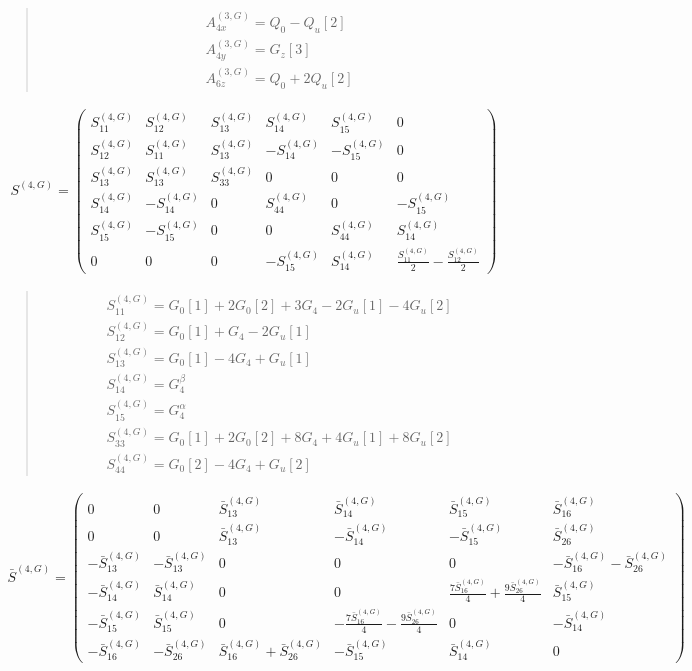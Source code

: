 \documentclass[fleqn,10pt]{jsarticle}
\begin{document}
\begin{quote}
\begin{align*}
& A^{(3,G)}_{4x} = Q_{0} - Q_{u}[2] \\
& A^{(3,G)}_{4y} = G_{z}[3] \\
& A^{(3,G)}_{6z} = Q_{0} + 2 Q_{u}[2]
\end{align*}
\end{quote}
\begin{align*}
S^{(4,G)} = \begin{pmatrix} S^{(4,G)}_{11} & S^{(4,G)}_{12} & S^{(4,G)}_{13} & S^{(4,G)}_{14} & S^{(4,G)}_{15} & 0 \\ S^{(4,G)}_{12} & S^{(4,G)}_{11} & S^{(4,G)}_{13} & - S^{(4,G)}_{14} & - S^{(4,G)}_{15} & 0 \\ S^{(4,G)}_{13} & S^{(4,G)}_{13} & S^{(4,G)}_{33} & 0 & 0 & 0 \\ S^{(4,G)}_{14} & - S^{(4,G)}_{14} & 0 & S^{(4,G)}_{44} & 0 & - S^{(4,G)}_{15} \\ S^{(4,G)}_{15} & - S^{(4,G)}_{15} & 0 & 0 & S^{(4,G)}_{44} & S^{(4,G)}_{14} \\ 0 & 0 & 0 & - S^{(4,G)}_{15} & S^{(4,G)}_{14} & \frac{S^{(4,G)}_{11}}{2} - \frac{S^{(4,G)}_{12}}{2} \end{pmatrix}
\end{align*}
\begin{quote}
\begin{align*}
& S^{(4,G)}_{11} = G_{0}[1] + 2 G_{0}[2] + 3 G_{4} - 2 G_{u}[1] - 4 G_{u}[2] \\
& S^{(4,G)}_{12} = G_{0}[1] + G_{4} - 2 G_{u}[1] \\
& S^{(4,G)}_{13} = G_{0}[1] - 4 G_{4} + G_{u}[1] \\
& S^{(4,G)}_{14} = G_{4}^{\beta} \\
& S^{(4,G)}_{15} = G_{4}^{\alpha} \\
& S^{(4,G)}_{33} = G_{0}[1] + 2 G_{0}[2] + 8 G_{4} + 4 G_{u}[1] + 8 G_{u}[2] \\
& S^{(4,G)}_{44} = G_{0}[2] - 4 G_{4} + G_{u}[2]
\end{align*}
\end{quote}
\begin{align*}
\bar{S}^{(4,G)} = \begin{pmatrix} 0 & 0 & \bar{S}^{(4,G)}_{13} & \bar{S}^{(4,G)}_{14} & \bar{S}^{(4,G)}_{15} & \bar{S}^{(4,G)}_{16} \\ 0 & 0 & \bar{S}^{(4,G)}_{13} & - \bar{S}^{(4,G)}_{14} & - \bar{S}^{(4,G)}_{15} & \bar{S}^{(4,G)}_{26} \\ - \bar{S}^{(4,G)}_{13} & - \bar{S}^{(4,G)}_{13} & 0 & 0 & 0 & - \bar{S}^{(4,G)}_{16} - \bar{S}^{(4,G)}_{26} \\ - \bar{S}^{(4,G)}_{14} & \bar{S}^{(4,G)}_{14} & 0 & 0 & \frac{7 \bar{S}^{(4,G)}_{16}}{4} + \frac{9 \bar{S}^{(4,G)}_{26}}{4} & \bar{S}^{(4,G)}_{15} \\ - \bar{S}^{(4,G)}_{15} & \bar{S}^{(4,G)}_{15} & 0 & - \frac{7 \bar{S}^{(4,G)}_{16}}{4} - \frac{9 \bar{S}^{(4,G)}_{26}}{4} & 0 & - \bar{S}^{(4,G)}_{14} \\ - \bar{S}^{(4,G)}_{16} & - \bar{S}^{(4,G)}_{26} & \bar{S}^{(4,G)}_{16} + \bar{S}^{(4,G)}_{26} & - \bar{S}^{(4,G)}_{15} & \bar{S}^{(4,G)}_{14} & 0 \end{pmatrix}
\end{align*}
\end{document}
